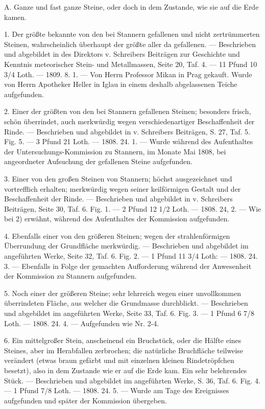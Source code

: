 \documentclass[a4paper, 11pt, oneside, polutonikogreek, german]{article}
\begin{document}
A. Ganze und fast ganze Steine, oder doch in dem Zustande, wie sie auf die Erde kamen.

1. Der größte bekannte von den bei Stannern gefallenen und nicht zertrümmerten Steinen, wahrscheinlich überhaupt der größte aller da gefallenen. — Beschrieben und abgebildet in des Direktors v. Schreibers Beiträgen zur Geschichte und Kenntnis meteorischer Stein- und Metallmassen, Seite 20, Taf. 4. — 11 Pfund 10 3/4 Loth. — 1809. 8. 1. — Von Herrn Professor Mikan in Prag gekauft. Wurde von Herrn Apotheker Heller in Iglau in einem deshalb abgelassenen Teiche aufgefunden.

2. Einer der größten von den bei Stannern gefallenen Steinen; besonders frisch, schön überrindet, auch merkwürdig wegen verschiedenartiger Beschaffenheit der Rinde. — Beschrieben und abgebildet in v. Schreibers Beiträgen, S. 27, Taf. 5. Fig. 5. — 3 Pfund 21 Loth. — 1808. 24. 1. — Wurde während des Aufenthaltes der Untersuchungs-Kommission zu Stannern, im Monate Mai 1808, bei angeordneter Aufsuchung der gefallenen Steine aufgefunden.

3. Einer von den großen Steinen von Stannern; höchst ausgezeichnet und vortrefflich erhalten; merkwürdig wegen seiner keilförmigen Gestalt und der Beschaffenheit der Rinde. — Beschrieben und abgebildet in v. Schreibers Beiträgen, Seite 30, Taf. 6. Fig. 1. — 2 Pfund 12 1/2 Loth. — 1808. 24, 2. — Wie bei 2) erwähnt, während des Aufenthaltes der Kommission aufgefunden.

4. Ebenfalls einer von den größeren Steinen; wegen der strahlenförmigen Überrundung der Grundfläche merkwürdig. — Beschrieben und abgebildet im angeführten Werke, Seite 32, Taf. 6. Fig. 2. — 1 Pfund 11 3/4 Loth: — 1808. 24. 3. — Ebenfalls in Folge der gemachten Aufforderung während der Anwesenheit der Kommission zu Stannern aufgefunden.

5. Noch einer der größeren Steine; sehr lehrreich wegen einer unvollkommen überrindeten Fläche, aus welcher die Grundmasse durchblickt. — Beschrieben und abgebildet im angeführten Werke, Seite 33, Taf. 6. Fig. 3. — 1 Pfund 6 7/8 Loth. — 1808. 24. 4. — Aufgefunden wie Nr. 2-4.

6. Ein mittelgroßer Stein, anscheinend ein Bruchstück, oder die Hälfte eines Steines, aber im Herabfallen zerbrochen; die natürliche Bruchfläche teilweise verändert (etwas braun gefärbt und mit einzelnen kleinen Rindetröpfchen besetzt), also in dem Zustande wie er auf die Erde kam. Ein sehr belehrendes Stück. — Beschrieben und abgebildet im angeführten Werke, S. 36, Taf. 6. Fig. 4. — 1 Pfund 7/8 Loth. — 1808. 24. 5. — Wurde am Tage des Ereignisses aufgefunden und später der Kommission übergeben.
\end{document}
